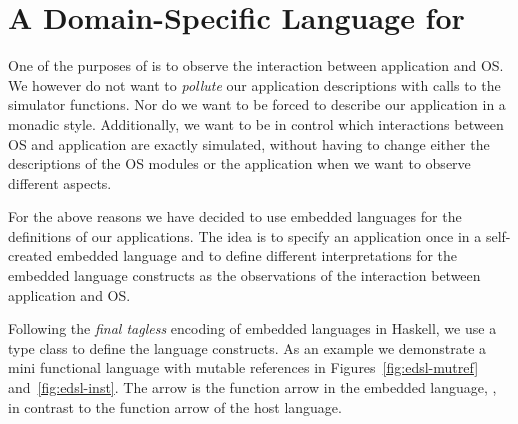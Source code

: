 \section{A Domain-Specific Language for \soosim}
\label{sec:dsl}
One of the purposes of \soosim is to observe the interaction between application and OS.
We however do not want to \emph{pollute} our application descriptions with calls to the simulator functions.
Nor do we want to be forced to describe our application in a monadic style.
Additionally, we want to be in control which interactions between OS and application are exactly simulated, without having to change either the descriptions of the OS modules or the application when we want to observe different aspects.

For the above reasons we have decided to use embedded languages for the definitions of our applications.
The idea is to specify an application once in a self-created embedded language and to define different interpretations for the embedded language constructs as the observations of the interaction between application and OS\nolinebreak[3]  \cite{Hofer:2008:PED:1449913.1449935}.

Following the \emph{final tagless} \cite{final_tagless_embedding} encoding of embedded languages in Haskell, we use a type class to define the language constructs.
As an example we demonstrate a mini functional language with mutable references in Figures~\ref{fig:edsl-mutref} and~\ref{fig:edsl-inst}.
The arrow \hs{:->} is the function arrow in the embedded language, \eg {}, in contrast to the function arrow \hs{->} of the host language.




